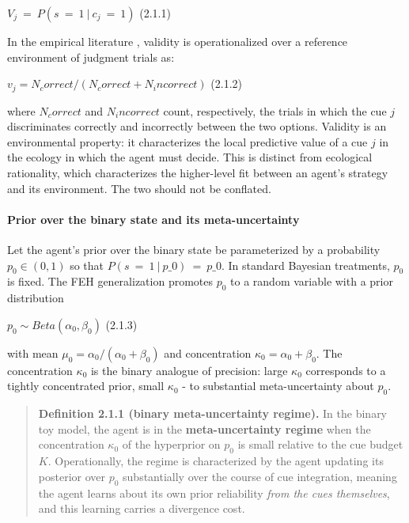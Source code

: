 \documentclass{article}
\begin{document}
\(V_{j}\  = \ P(s\  = \ 1\ |\ c_{j}\  = \ 1)\) (2.1.1)

In the empirical literature \cite{gigerenzer1996, gigerenzer1999}, validity is operationalized
over a reference environment of judgment trials as:

\(v_{j} = N_{c}orrect\text{/}\left( N_{c}orrect + N_{i}ncorrect \right)\)
(2.1.2)

where \(N_{c}orrect\) and \(N_{i}ncorrect\) count, respectively, the
trials in which the cue \(j\) discriminates correctly and incorrectly
between the two options. Validity is an environmental property: it
characterizes the local predictive value of a cue \(j\) in the ecology
in which the agent must decide. This is distinct from ecological
rationality, which characterizes the higher-level fit between an agent's
strategy and its environment. The two should not be conflated.

\paragraph{Prior over the binary state and its
meta-uncertainty}\label{prior-over-the-binary-state-and-its-meta-uncertainty}

Let the agent's prior over the binary state be parameterized by a
probability \(p_{0} \in (0,1)\) so that
\(P(s\  = \ 1\ |\ p\_ 0)\  = \ p\_ 0\). In standard Bayesian treatments,
\(p_{0}\) is fixed. The FEH generalization promotes \(p_{0}\) to a
random variable with a prior distribution

\(p_{0} \sim Beta\left( \alpha_{0},\beta_{0} \right)\) (2.1.3)

with mean
\(\mu_{0} = \alpha_{0}\text{/}\left( \alpha_{0} + \beta_{0} \right)\)
and concentration \(\kappa_{0} = \alpha_{0} + \beta_{0}\). The
concentration \(\kappa_{0}\) is the binary analogue of precision: large
\(\kappa_{0}\) corresponds to a tightly concentrated prior, small
\(\kappa_{0}\) - to substantial meta-uncertainty about \(p_{0}\).

\begin{quote}
\textbf{Definition 2.1.1 (binary meta-uncertainty regime).} In the
binary toy model, the agent is in the \textbf{meta-uncertainty regime}
when the concentration \(\kappa_{0}\) of the hyperprior on \(p_{0}\) is
small relative to the cue budget \(K\). Operationally, the regime is
characterized by the agent updating its posterior over \(p_{0}\)
substantially over the course of cue integration, meaning the agent
learns about its own prior reliability \emph{from the cues themselves},
and this learning carries a divergence cost.
\end{quote}
\end{document}

